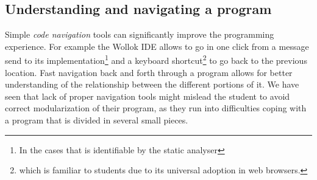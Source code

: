 %
%


\subsection{Understanding and navigating a program}
Simple \emph{code navigation} tools can significantly improve the programming experience.
For example the Wollok IDE allows to go in one click from a message send to its implementation\footnote{In the cases that is identifiable by the static analyser} and a keyboard shortcut\footnote{ which is familiar to students due to its universal adoption in web browsers.} to go back to the previous location.
Fast navigation back and forth through a program allows for better understanding of the relationship between the different portions of it.
We have seen that lack of proper navigation tools might mislead the student to avoid correct modularization of their program, as they run into difficulties coping with a program that is divided in several small pieces.

